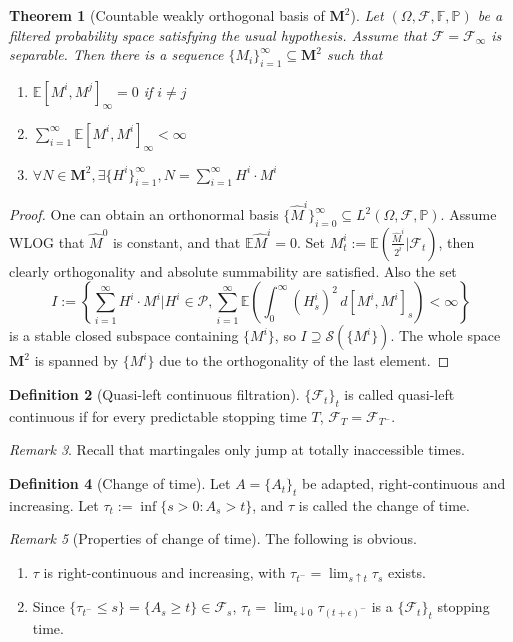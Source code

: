 \documentclass[openany,oneside]{book}
\newtheorem{thm}{Theorem}[section]
\theoremstyle{definition}
\newtheorem{defn}[thm]{Definition}
\theoremstyle{remark}
\newtheorem{rem}[thm]{Remark}
\newcommand{\E}{\mathbb{E}} %
\renewcommand{\P}{\mathbb{P}} %
\newcommand{\pred}{\mathcal{P}} %
\begin{document}
\begin{thm}[Countable weakly orthogonal basis of $\mathbf{M}^2$]
Let $(\Omega,\mathcal{F}, \mathbb{F}, \P)$ be a filtered probability space satisfying the usual hypothesis. Assume that $\mathcal{F}=\mathcal{F}_{\infty}$ is separable. Then there is a sequence $\{M_i\}_{i=1}^\infty \subseteq \mathbf{M}^2$ such that
\begin{enumerate}
\item $\E[M^i,M^j]_\infty =0$ if $i\ne j$
\item $\sum_{i=1}^\infty \E[M^i,M^i]_{\infty} < \infty$
\item $\forall N\in\mathbf{M}^2, \exists \{H^i\}_{i=1}^\infty, N=\sum_{i=1}^\infty H^i \cdot M^i$
\end{enumerate}
\end{thm}
\begin{proof}
One can obtain an orthonormal basis $\{\hat{M}^i\}_{i=0}^\infty \subseteq L^2(\Omega,\mathcal{F},\P)$. Assume WLOG that $\hat{M}^0$ is constant, and that $\E\hat{M}^i=0$. Set $M^i_t := \E\left(\frac{\hat{M}^i}{2^i} \big\vert\mathcal{F}_t\right)$, then clearly orthogonality and absolute summability are satisfied. Also the set $$I:=\left\{ \sum_{i=1}^\infty H^i \cdot M^i \big\vert H^i\in\pred, \sum_{i=1}^\infty \E\left(\int_0^\infty (H^i_s)^2 \,d[M^i,M^i]_s\right) < \infty \right\}$$ is a stable closed subspace containing $\{M^i\}$, so $I\supseteq \mathcal{S}(\{M^i\})$. The whole space $\mathbf{M}^2$ is spanned by $\{M^i\}$ due to the orthogonality of the last element.
\end{proof}

\begin{defn}[Quasi-left continuous filtration]
$\{\mathcal{F}_t\}_t$ is called quasi-left continuous if for every predictable stopping time $T$, $\mathcal{F}_T = \mathcal{F}_{T^-}$.
\end{defn}

\begin{rem}
Recall that martingales only jump at totally inaccessible times.
\end{rem}

\begin{defn}[Change of time]
Let $A=\{A_t\}_t$ be adapted, right-continuous and increasing. Let $\tau_t:=\inf\{s>0 : A_s > t\}$, and $\tau$ is called the change of time.
\end{defn}
\begin{rem}[Properties of change of time]
The following is obvious. \\
\begin{enumerate}
\item $\tau$ is right-continuous and increasing, with $\tau_{t^-} = \lim_{s\uparrow t} \tau_s$ exists.
\item Since $\{\tau_{t^-} \le s\} = \{A_s \ge t\} \in \mathcal{F}_s$, $\tau_t = \lim_{\epsilon\downarrow 0}\tau_{(t+\epsilon)^-}$ is a $\{\mathcal{F}_t\}_t$ stopping time.
\end{enumerate}
\end{rem}
\end{document}
